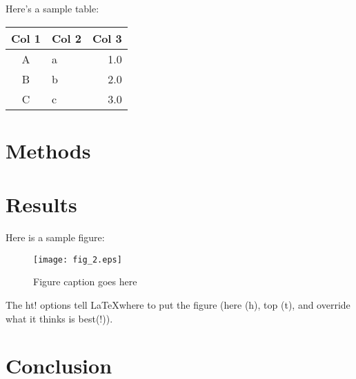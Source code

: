 \documentclass{ndreureport}
\begin{document}
Here's a sample table:

\begin{center}
    \begin{tabular}{c|l|r}
        Col 1 & Col 2 & Col 3 \\ \hline
        A & a & 1.0 \\ 
        B & b & 2.0 \\  
        C & c & 3.0    
    \end{tabular}
\end{center}

\section{Methods}

\lipsum[2]

\section{Results}

\lipsum[6]

Here is a sample figure:

\begin{figure}[ht!]
    \centering
    \texttt{[image: fig\_2.eps]}
    \caption{Figure caption goes here}
    \label{fig:test}
\end{figure}

The ht! options tell \LaTeX where to put the figure (here (h), top (t), and override what it thinks is best(!)).

\section{Conclusion}

\lipsum[2]


\end{document}
